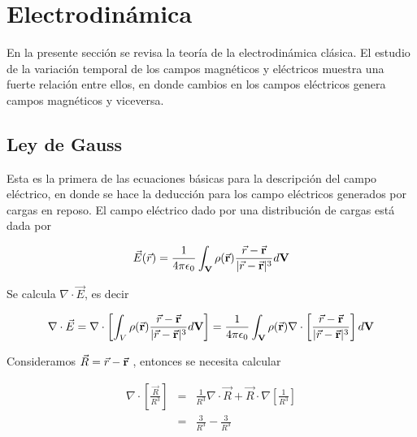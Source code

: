 \setcounter{page}{1}
\chapter{Electrodinámica}






En la presente sección se revisa la teoría de la  electrodinámica clásica. El estudio de la variación temporal de los campos magnéticos y eléctricos muestra una fuerte relación entre ellos, en donde cambios en los campos eléctricos genera campos magnéticos y viceversa.\cite{Chaichian}\\



\section{Ley de Gauss}

Esta es la primera de las ecuaciones básicas para la descripción del campo eléctrico, en donde se hace la deducción para los campo eléctricos generados por cargas en reposo. El campo eléctrico dado por una distribución de cargas está dada por\cite{Jackson}

\begin{eqnarray}
    \vec{E}(\vec{r}) =\frac{1}{4\pi\epsilon_{0}} \int_{\bf{V}}\rho(\vec{\bf{r}}
)\frac{\vec{r}-\vec{\bf{r}}}{|\vec{r}-\vec{\bf{r}}|^{3}}d\bf{V}
\end{eqnarray}

Se calcula $\nabla \cdot \vec{E}$, es decir

\begin{eqnarray}
\label{integralGauss}
    \nabla \cdot \vec{E} = \nabla\cdot\left[\int_{V}\rho(\vec{\bf{r}}
)\frac{\vec{r}-\vec{\bf{r}}}{|\vec{r}-\vec{\bf{r}}|^{3}}d\bf{V}\right] = \frac{1}{4\pi\epsilon_{0}}\int_{\bf{V}}\rho(\vec{\bf{r}})\nabla\cdot\left[\frac{\vec{r}-\vec{\bf{r}}}{|\vec{r}-\vec{\bf{r}}|^{3}}\right]d\bf{V}
\end{eqnarray}

Consideramos $\vec{R} = \vec{r}-\vec{\bf{r}}$ , entonces se necesita calcular 

\begin{eqnarray}
    \nabla\cdot\left[\frac{\vec{R}}{R^{3}}\right] &=& \frac{1}{R^{3}}\nabla\cdot\vec{R}+\vec{R}\cdot\nabla\left[\frac{1}{R^{3}}\right]\\
    &=&\frac{3}{R^{3}} - \frac{3}{R^{3}} 
\end{eqnarray}

